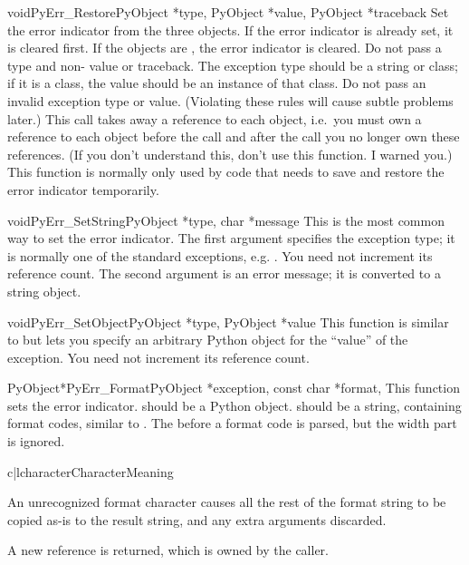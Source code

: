 \documentclass{manual}
\begin{document}
\begin{cfuncdesc}{void}{PyErr_Restore}{PyObject *type, PyObject *value,
                                       PyObject *traceback}
Set  the error indicator from the three objects.  If the error
indicator is already set, it is cleared first.  If the objects are
\NULL{}, the error indicator is cleared.  Do not pass a \NULL{} type
and non-\NULL{} value or traceback.  The exception type should be a
string or class; if it is a class, the value should be an instance of
that class.  Do not pass an invalid exception type or value.
(Violating these rules will cause subtle problems later.)  This call
takes away a reference to each object, i.e.\ you must own a reference
to each object before the call and after the call you no longer own
these references.  (If you don't understand this, don't use this
function.  I warned you.)    This function is normally
only used by code that needs to save and restore the error indicator
temporarily.
\end{cfuncdesc}

\begin{cfuncdesc}{void}{PyErr_SetString}{PyObject *type, char *message}
This is the most common way to set the error indicator.  The first
argument specifies the exception type; it is normally one of the
standard exceptions, e.g. .  You need not
increment its reference count.  The second argument is an error
message; it is converted to a string object.
\end{cfuncdesc}

\begin{cfuncdesc}{void}{PyErr_SetObject}{PyObject *type, PyObject *value}
This function is similar to  but lets you
specify an arbitrary Python object for the ``value'' of the exception.
You need not increment its reference count.
\end{cfuncdesc}

\begin{cfuncdesc}{PyObject*}{PyErr_Format}{PyObject *exception,
                                           const char *format, \moreargs}
This function sets the error indicator.
 should be a Python object.
 should be a string, containing format codes, similar to 
. The  before a format code
is parsed, but the width part is ignored.

\begin{tableii}{c|l}{character}{Character}{Meaning}
\end{tableii}

An unrecognized format character causes all the rest of
the format string to be copied as-is to the result string,
and any extra arguments discarded.

A new reference is returned, which is owned by the caller.
\end{cfuncdesc}
\end{document}

